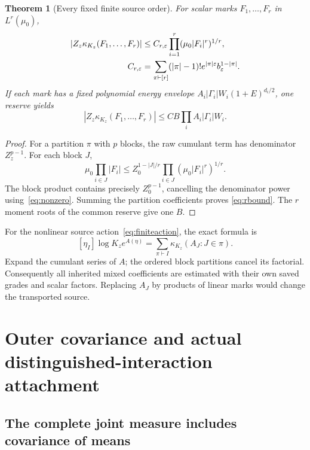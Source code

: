 \documentclass[11pt,letterpaper]{article}
\theoremstyle{plain}
\newtheorem{theorem}{Theorem}[section]
\theoremstyle{remark}\newtheorem{remark}[theorem]{Scope}
\begin{document}
\begin{theorem}[Every fixed finite source order]
For scalar marks $F_1,\ldots,F_r$ in $L^r(\mu_0)$,
\begin{align}
\left|Z_z\kappa_{K_z}(F_1,\ldots,F_r)\right|
&\le C_{r,\varepsilon}\prod_{i=1}^r(\mu_0|F_i|^r)^{1/r},\notag\\
C_{r,\varepsilon}
&=\sum_{\pi\vdash[r]}(|\pi|-1)!e^{|\pi|\varepsilon}
b_\varepsilon^{1-|\pi|}.
\label{eq:rbound}
\end{align}
If each mark has a fixed polynomial energy envelope
$A_i|\Gamma_i|W_i(1+E)^{d_i/2}$, one reserve yields
\begin{equation}
\left|Z_z\kappa_{K_z}(F_1,\ldots,F_r)\right|
\le C B\prod_i A_i|\Gamma_i|W_i.
\label{eq:rbank}
\end{equation}
\end{theorem}
\begin{proof}
For a partition $\pi$ with $p$ blocks, the raw cumulant term has denominator
$Z_z^{p-1}$. For each block $J$,
\[
\mu_0\prod_{i\in J}|F_i|
\le Z_0^{1-|J|/r}\prod_{i\in J}(\mu_0|F_i|^r)^{1/r}.
\]
The block product contains precisely $Z_0^{p-1}$, cancelling the denominator
power using~\eqref{eq:nonzero}. Summing the partition coefficients proves
\eqref{eq:rbound}. The $r$ moment roots of the common reserve give one $B$.
\end{proof}

For the nonlinear source action~\eqref{eq:finiteaction}, the exact formula is
\begin{equation}
\boxed{
[\eta_I]\log K_ze^{A(\eta)}
=\sum_{\pi\vdash I}\kappa_{K_z}(A_J:J\in\pi).}
\label{eq:nonlinearcumulants}
\end{equation}
Expand the cumulant series of $A$; the ordered block partitions cancel its
factorial. Consequently all inherited mixed coefficients are estimated with
their own saved grades and scalar factors. Replacing $A_J$ by products of
linear marks would change the transported source.

\section{Outer covariance and actual distinguished-interaction attachment}
\label{sec:outer}

\subsection{The complete joint measure includes covariance of means}
\end{document}
